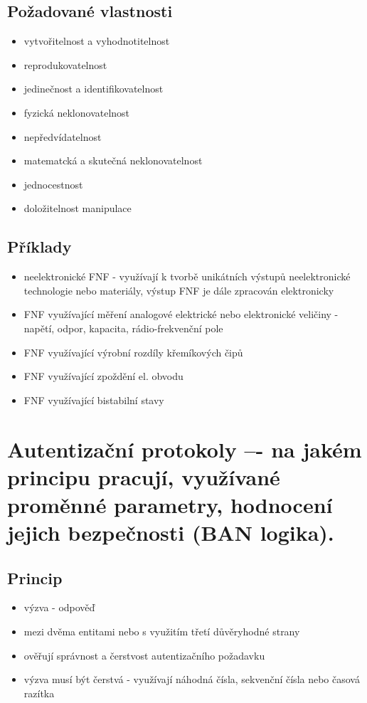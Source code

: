 \subsection{Požadované vlastnosti}
\begin{itemize}
    \item vytvořitelnost a vyhodnotitelnost
    \item reprodukovatelnost
    \item jedinečnost a identifikovatelnost
    \item fyzická neklonovatelnost
    \item nepředvídatelnost
    \item matematcká a skutečná neklonovatelnost
    \item jednocestnost
    \item doložitelnost manipulace
\end{itemize}

\subsection{Příklady}
\begin{itemize}
    \item neelektronické FNF - využívají k tvorbě unikátních výstupů neelektronické technologie nebo materiály, výstup FNF je dále zpracován elektronicky
    \item FNF využívající měření analogové elektrické nebo elektronické veličiny - napětí, odpor, kapacita, rádio-frekvenční pole
    \item FNF využívající výrobní rozdíly křemíkových čipů
    \item FNF využívající zpoždění el. obvodu
    \item FNF využívající bistabilní stavy
\end{itemize}

\clearpage
\section{Autentizační protokoly –- na jakém principu pracují, využívané proměnné parametry, hodnocení jejich bezpečnosti (BAN logika).}
\subsection{Princip}
\begin{itemize}
    \item výzva - odpověď
    \item mezi dvěma entitami nebo s využitím třetí důvěryhodné strany
    \item ověřují správnost a čerstvost autentizačního požadavku
    \item výzva musí být čerstvá - využívají náhodná čísla, sekvenční čísla nebo časová razítka
\end{itemize}

